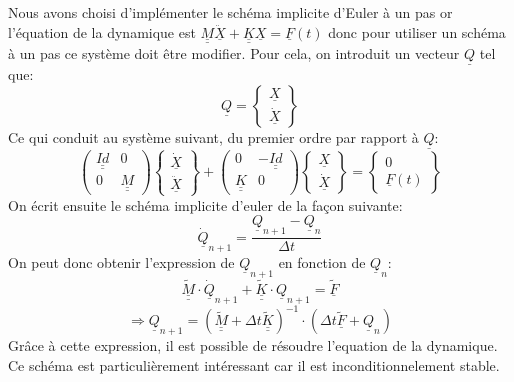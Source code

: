 \documentclass[]{article}
\begin{document}
Nous avons choisi d'implémenter le schéma implicite d'Euler à un pas or
l'équation de la dynamique est $\underline{\underline{M}}\underline{\ddot{X}} +
\underline{\underline{K}}\underline{X} = \underline{F}(t)$ donc pour utiliser
un schéma à un pas ce système doit être modifier. Pour cela, on introduit un
vecteur $\underline{Q}$ tel que:
\begin{displaymath}
\underline{Q}=
\left\lbrace  \begin{array}{c}
\underline{X} \\ 
\underline{\dot{X}}
\end{array}\right\rbrace 
\end{displaymath}
Ce qui conduit au système suivant, du premier ordre par rapport à
$\underline{Q}$:
\begin{displaymath}
\left( \begin{array}{cc}
\underline{\underline{Id}} & 0 \\ 
0 & \underline{\underline{M}}
\end{array}\right) 
\left\lbrace  \begin{array}{c}
\underline{\dot{X}} \\ 
\underline{\ddot{X}}
\end{array}\right\rbrace  +
\left( \begin{array}{cc}
0 & -\underline{\underline{Id}} \\ 
\underline{\underline{K}} & 0
\end{array}\right)
\left\lbrace  \begin{array}{c}
\underline{X} \\ 
\underline{\dot{X}}
\end{array}\right\rbrace  = 
\left\lbrace \begin{array}{c}
0 \\ 
\underline{F}(t)
\end{array}\right\rbrace 
\end{displaymath}
On écrit ensuite le schéma implicite d'euler de la façon suivante:
$$
\underline{\dot{Q}}_{n+1} = \dfrac{\underline{Q}_{n+1} -
\underline{Q}_{n}}{\Delta t}
$$
On peut donc obtenir l'expression de $\underline{Q}_{n+1}$ en fonction de
$\underline{Q}_{n}$:
$$
\underline{\underline{\tilde{M}}}\cdot\underline{\dot{Q}}_{n+1} +
\underline{\underline{\tilde{K}}}\cdot\underline{Q}_{n+1} =
\underline{\tilde{F}}$$
$$\Rightarrow \underline{Q}_{n+1} = \left( \underline{\underline{\tilde{M}}} +
\Delta t \underline{\underline{\tilde{K}}}\right)^{-1}\cdot\left( \Delta t
\underline{\tilde{F}} + \underline{Q}_{n}\right) $$
Grâce à cette expression, il est possible de résoudre l'equation de la
dynamique. Ce schéma est particulièrement intéressant car il est
inconditionnelement stable.
\end{document}
